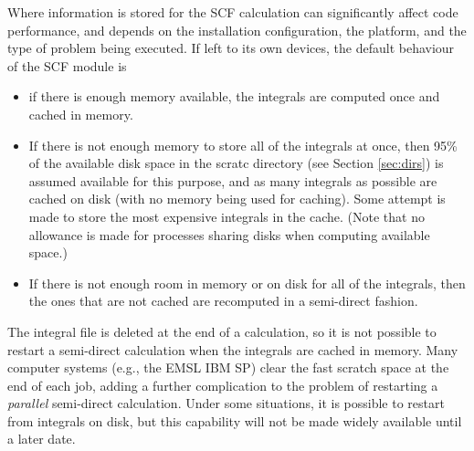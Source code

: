 Where information is stored for the SCF calculation can significantly 
affect code performance, and depends on the installation configuration,
the platform, and the type of problem being executed.  If left to its own
devices,
the default behaviour of the SCF module is
\begin{itemize}
\item if there is enough memory available, the integrals are computed
once and cached in memory.
\item If there is not enough memory to store all of the integrals at once,
then 95\% of the available disk space in the scratc directory
  (see Section \ref{sec:dirs}) is assumed available for this purpose,
  and as many integrals as possible are cached on disk (with no
  memory being used for caching).  Some attempt is made to 
  store the most expensive integrals in the cache.  (Note that no allowance 
is made for processes sharing disks when computing available space.)
\item If there is not enough room in memory or on disk for all of the
integrals, then the ones that are not cached are
recomputed in a semi-direct fashion.
\end{itemize}

The integral file is deleted at the end of a calculation, so it is not
possible to restart a semi-direct calculation when the integrals are
cached in memory.  Many computer systems (e.g., the EMSL IBM SP) clear
the fast scratch space at the end of each job, adding a further complication
to the problem of restarting a {\em parallel} semi-direct calculation.
Under some situations, it is possible to restart from integrals on disk,
but this capability will not be made widely available until a later date.


